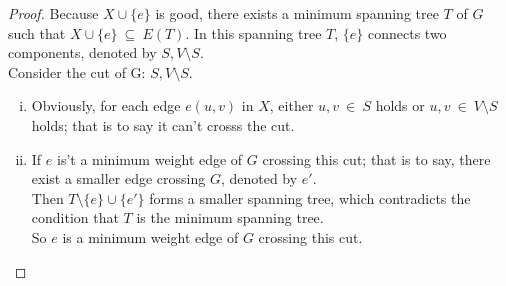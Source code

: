 \begin{proof}
	Because $X \cup \{e\}$ is good, there exists a minimum spanning tree $T$ of $G$ such that $X \cup \{e\}~\subseteq~E(T)$.
	In this spanning tree $T$, $\{e\}$ connects two components, denoted by $S, V \setminus S$. \\
	Consider the cut of G: $S, V \setminus S$.
	\begin{enumerate}[(i)]
		\item Obviously, for each edge $e(u,v)$ in $X$, either $u,v~\in~S$ holds or $u,v~\in~V\setminus S$ holds; that is to say it can't crosss the cut.
		\item If $e$ is't a minimum weight edge of $G$ crossing this cut; that is to say, there exist a smaller edge crossing $G$, denoted by $e'$.\\
			Then $T\setminus\{e\} \cup \{e'\}$ forms a smaller spanning tree, which contradicts the condition that $T$ is the minimum spanning tree.\\
			So $e$ is a minimum weight edge of $G$ crossing this cut.
	\end{enumerate}
\end{proof}